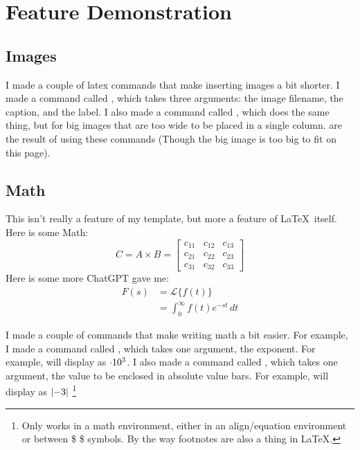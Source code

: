 \section{Feature Demonstration}

\subsection{Images}

I made a couple of latex commands that make inserting images a bit shorter. I made a command called \code{\insertimage{}{}{}}, which takes three arguments: the image filename, the caption, and the label. I also made a command called \code{\insertbigimage{}{}{}}, which does the same thing, but for big images that are too wide to be placed in a single column.  are the result of using these commands (Though the big image is too big to fit on this page).



\subsection{Math}

This isn't really a feature of my template, but more a feature of \LaTeX \ itself. 
Here is some Math:
\begin{equation}
    C = A \times B = \begin{bmatrix}
        c_{11} & c_{12} & c_{13} \\
        c_{21} & c_{22} & c_{23} \\
        c_{31} & c_{32} & c_{33}
    \end{bmatrix}
\end{equation}
Here is some more ChatGPT gave me:
\begin{align*}
    F(s) &= \mathcal{L} \{ f(t) \} \\
    &= \int_{0}^{\infty} f(t) e^{-st} \, dt
\end{align*}

I made a couple of commands that make writing math a bit easier. For example, I made a command called \code{\E{}}, which takes one argument, the exponent. For example,  will display as $\cdot 10^{3}$. I also made a command called \code{\abs{}}, which takes one argument, the value to be enclosed in absolute value bars. For example,  will display as $\left\lvert -3 \right\rvert$ \footnote[1]{Only works in a math environment, either in an align/equation environment or between \$ \$ symbols. By the way footnotes are also a thing in \LaTeX.}


